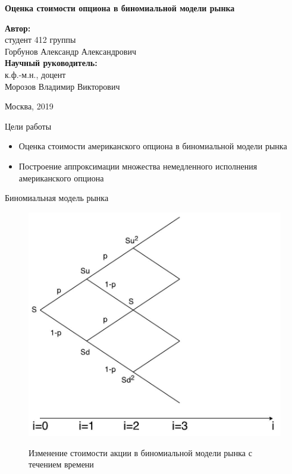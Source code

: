 \documentclass[12pt]{beamer}
\begin{document}
 
\begin{frame}
    \begin{center}
        \large \textbf{Оценка стоимости опциона в биномиальной модели рынка} 
    \end{center}
    \begin{flushright}
        \bigskip \bigskip \small
        \textbf{Автор:} \\ студент 412 группы \\ Горбунов Александр Александрович \\
        \bigskip
        \textbf{Научный руководитель:} \\ к.ф.-м.н., доцент \\ Морозов Владимир Викторович
    \end{flushright}
    \begin{center}
        \bigskip \bigskip \bigskip
        \footnotesize Москва, 2019
    \end{center} 
\end{frame}
 
\begin{frame}{Цели работы}
    \begin{itemize}
        \item Оценка стоимости американского опциона в биномиальной модели рынка \\
        \item Построение аппроксимации множества немедленного исполнения американского опциона \\
    \end{itemize}
\end{frame}

\begin{frame}{Биномиальная модель рынка}
    \begin{figure}[h]
        \centering
        \includegraphics[scale=0.35]{scheme.jpg}
        \label{binomial}
        \caption{Изменение стоимости акции в биномиальной модели рынка с течением времени}
    \end{figure}
\end{frame}
\end{document}
